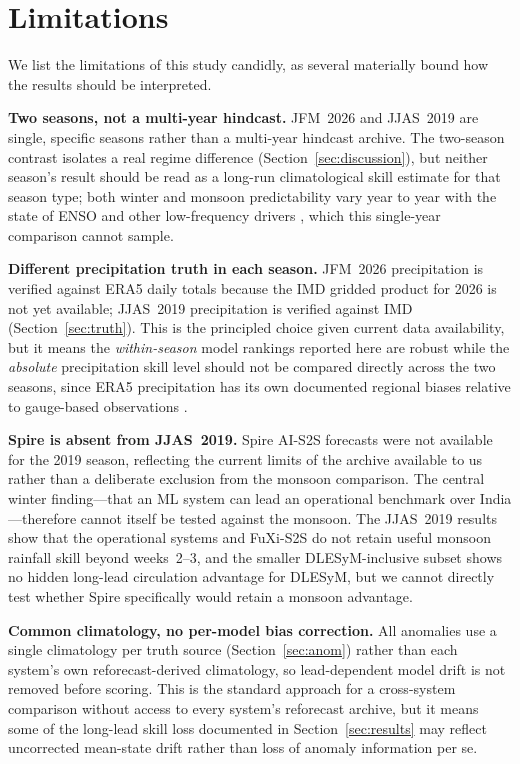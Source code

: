 \documentclass[11pt,a4paper]{article}
\begin{document}
\section{Limitations}\label{sec:limitations}

We list the limitations of this study candidly, as several materially bound
how the results should be interpreted.

\textbf{Two seasons, not a multi-year hindcast.} JFM~2026 and JJAS~2019 are
single, specific seasons rather than a multi-year hindcast archive. The
two-season contrast isolates a real regime difference (Section~\ref{sec:discussion}),
but neither season's result should be read as a long-run climatological skill
estimate for that season type; both winter and monsoon predictability vary
year to year with the state of ENSO and other low-frequency drivers
\citep{mariotti2020,domeisen2022}, which this single-year comparison cannot
sample.

\textbf{Different precipitation truth in each season.} JFM~2026 precipitation
is verified against ERA5 daily totals because the IMD gridded product for 2026
is not yet available; JJAS~2019 precipitation is verified against IMD
(Section~\ref{sec:truth}). This is the principled choice given current data
availability, but it means the \emph{within-season} model rankings reported
here are robust while the \emph{absolute} precipitation skill level should not
be compared directly across the two seasons, since ERA5 precipitation has its
own documented regional biases relative to gauge-based observations
\citep{hersbach2020}.

\textbf{Spire is absent from JJAS~2019.} Spire AI-S2S forecasts were not
available for the 2019 season, reflecting the current limits of the archive
available to us rather than a deliberate exclusion from the monsoon comparison.
The central winter finding---that an ML system can lead an operational
benchmark over India---therefore cannot itself be tested against the monsoon.
The JJAS~2019 results show that the operational systems and FuXi-S2S do not
retain useful monsoon rainfall skill beyond weeks~2--3, and the smaller
DLESyM-inclusive subset shows no hidden long-lead circulation advantage for
DLESyM, but we cannot directly test whether Spire specifically would retain a
monsoon advantage.

\textbf{Common climatology, no per-model bias correction.} All anomalies use a
single climatology per truth source (Section~\ref{sec:anom}) rather than each
system's own reforecast-derived climatology, so lead-dependent model drift is
not removed before scoring. This is the standard approach for a cross-system
comparison without access to every system's reforecast archive, but it means
some of the long-lead skill loss documented in Section~\ref{sec:results} may
reflect uncorrected mean-state drift rather than loss of anomaly information
per se.
\end{document}
